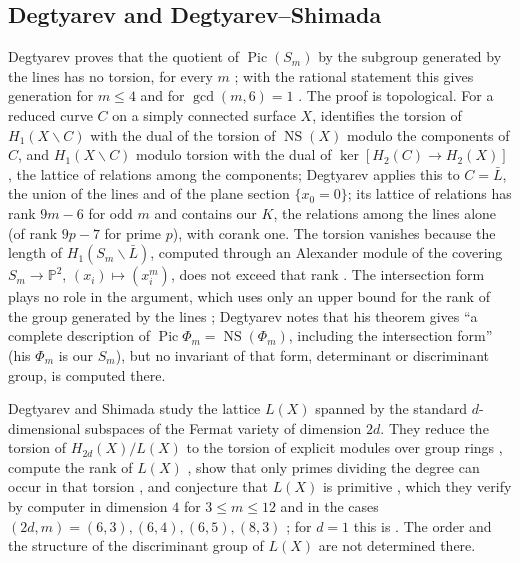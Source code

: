 \documentclass[11pt]{article}
\theoremstyle{definition}
\theoremstyle{remark}
\newcommand{\Pp}{\mathbb{P}}
\newcommand{\NS}{\operatorname{NS}}
\begin{document}
\subsection{Degtyarev and Degtyarev--Shimada}

Degtyarev proves that the quotient of $\operatorname{Pic}(S_m)$ by the subgroup generated by the lines has no torsion, for every $m$ \cite[Theorem~1.3]{Deg}; with the rational statement \cite{Sh82} this gives generation for $m\le4$ and for $\gcd(m,6)=1$ \cite[Theorem~1.2]{Deg}. The proof is topological. For a reduced curve $C$ on a simply connected surface $X$, \cite[Theorem~2.2]{Deg} identifies the torsion of $H_1(X\smallsetminus C)$ with the dual of the torsion of $\NS(X)$ modulo the components of $C$, and $H_1(X\smallsetminus C)$ modulo torsion with the dual of $\ker[H_2(C)\to H_2(X)]$, the lattice of relations among the components; Degtyarev applies this to $C=\bar L$, the union of the lines and of the plane section $\{x_0=0\}$; its lattice of relations has rank $9m-6$ for odd $m$ and contains our $K$, the relations among the lines alone (of rank $9p-7$ for prime $p$), with corank one. The torsion vanishes because the length of $H_1(S_m\smallsetminus\bar L)$, computed through an Alexander module of the covering $S_m\to\Pp^2$, $(x_i)\mapsto(x_i^m)$, does not exceed that rank \cite[(3.21), Lemma~4.4, \S4.2]{Deg}. The intersection form plays no role in the argument, which uses only an upper bound for the rank of the group generated by the lines \cite[Remark~4.15]{Deg}; Degtyarev notes that his theorem gives ``a complete description of $\operatorname{Pic}\Phi_m=\NS(\Phi_m)$, including the intersection form'' \cite[\S1]{Deg} (his $\Phi_m$ is our $S_m$), but no invariant of that form, determinant or discriminant group, is computed there.

Degtyarev and Shimada \cite{DS} study the lattice $L(X)$ spanned by the standard $d$-dimensional subspaces of the Fermat variety of dimension $2d$. They reduce the torsion of $H_{2d}(X)/L(X)$ to the torsion of explicit modules over group rings \cite[Theorem~1.1]{DS}, compute the rank of $L(X)$ \cite[Theorem~1.4]{DS}, show that only primes dividing the degree can occur in that torsion \cite[Corollary~1.5]{DS}, and conjecture that $L(X)$ is primitive \cite[Conjecture~1.2]{DS}, which they verify by computer in dimension $4$ for $3\le m\le12$ and in the cases $(2d,m)=(6,3),(6,4),(6,5),(8,3)$ \cite[\S5]{DS}; for $d=1$ this is \cite{Deg}. The order and the structure of the discriminant group of $L(X)$ are not determined there.
\end{document}
